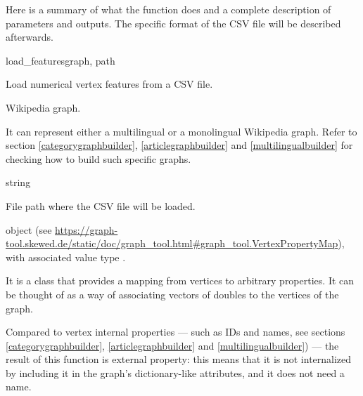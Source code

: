             Here is a summary of what the function does and a complete description of parameters and outputs. The specific format of the CSV file will be described afterwards.
            \begin{independentfunctiondoc}{load\_features}{graph, path}
                \begin{functiondescription}
                    Load numerical vertex features from a CSV file.
                \end{functiondescription}
                
                \begin{functionparameters}
                    \item[graph] 
                    
                    Wikipedia graph.
                    
                    It can represent either a multilingual or a monolingual Wikipedia graph. Refer to section \ref{categorygraphbuilder}, \ref{articlegraphbuilder} and \ref{multilingualbuilder} for checking how to build such specific graphs.
                    \item[path] string
                    
                    File path where the CSV file will be loaded.
                \end{functionparameters}
                
                \begin{functionoutput}
                     object (see \url{https://graph-tool.skewed.de/static/doc/graph_tool.html\#graph_tool.VertexPropertyMap}), with associated value type .
                    
                    It is a class that provides a mapping from vertices to arbitrary properties. It can be thought of as a way of associating vectors of doubles to the vertices of the graph.
                    
                    Compared to vertex internal properties --- such as IDs and names, see sections \ref{categorygraphbuilder}, \ref{articlegraphbuilder} and \ref{multilingualbuilder}) --- the result of this function is external property: this means that it is not internalized by including it in the graph's dictionary-like attributes, and it does not need a name.
                \end{functionoutput}
            \end{independentfunctiondoc}
